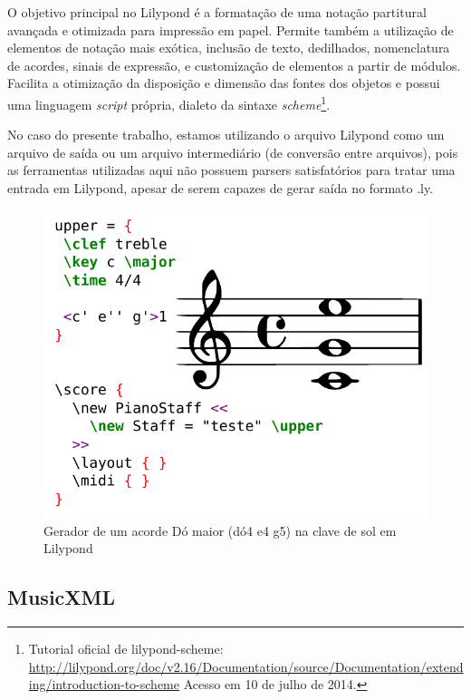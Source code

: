 \documentclass[
	12pt,				%
	openright,			%
	twoside,			%
	a4paper,			%
	english,			%
	french,				%
	spanish,			%
	brazil				%
	]{abntex2}
\begin{document}
O objetivo principal no Lilypond é a formatação de uma notação partitural avançada e otimizada para impressão em papel. Permite também a utilização de elementos de notação mais exótica, inclusão de texto, dedilhados, nomenclatura de acordes, sinais de expressão, e customização de elementos a partir de módulos. Facilita a otimização da disposição e dimensão das fontes dos objetos e possui uma linguagem \textit{script} própria, dialeto da sintaxe \textit{scheme}\footnote{Tutorial oficial de lilypond-scheme: \url{http://lilypond.org/doc/v2.16/Documentation/source/Documentation/extending/introduction-to-scheme} Acesso em 10 de julho de 2014.}.

No caso do presente trabalho, estamos utilizando o arquivo Lilypond como um arquivo de saída ou um arquivo intermediário (de conversão entre arquivos), pois as ferramentas utilizadas aqui não possuem parsers satisfatórios para tratar uma entrada em Lilypond, apesar de serem capazes de gerar saída no formato .ly.


\begin{figure}[htb]
	\caption{\label{fig_grafico}Gerador de um acorde Dó maior (dó4 e4 g5) na clave de sol em Lilypond}
	\begin{center}
	    \includegraphics[scale=0.75]{score/lilypond.pdf}
	\end{center}
\end{figure}


\subsection{MusicXML}
\end{document}
